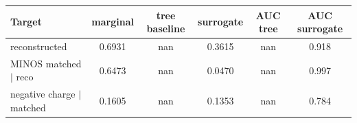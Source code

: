 \begin{tabular}{lccccc}
\toprule
Target & marginal & tree baseline & surrogate & AUC tree & AUC surrogate \\
\midrule
reconstructed & 0.6931 & nan & 0.3615 & nan & 0.918 \\
MINOS matched $\mid$ reco & 0.6473 & nan & 0.0470 & nan & 0.997 \\
negative charge $\mid$ matched & 0.1605 & nan & 0.1353 & nan & 0.784 \\
\bottomrule
\end{tabular}

